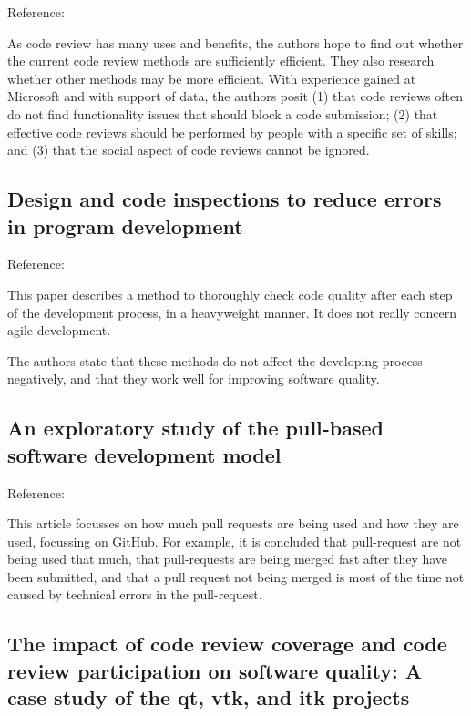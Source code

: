 \documentclass[]{book}
\begin{document}
Reference: \citet{czerwonka2015code}

As code review has many uses and benefits, the authors hope to find out
whether the current code review methods are sufficiently efficient. They
also research whether other methods may be more efficient. With
experience gained at Microsoft and with support of data, the authors
posit (1) that code reviews often do not find functionality issues that
should block a code submission; (2) that effective code reviews should
be performed by people with a specific set of skills; and (3) that the
social aspect of code reviews cannot be ignored.

\subsection{Design and code inspections to reduce errors in program
development}\label{design-and-code-inspections-to-reduce-errors-in-program-development}

Reference: \citet{fagan2002design}

This paper describes a method to thoroughly check code quality after
each step of the development process, in a heavyweight manner. It does
not really concern agile development.

The authors state that these methods do not affect the developing
process negatively, and that they work well for improving software
quality.

\subsection{An exploratory study of the pull-based software development
model}\label{an-exploratory-study-of-the-pull-based-software-development-model}

Reference: \citet{gousios2014exploratory}

This article focusses on how much pull requests are being used and how
they are used, focussing on GitHub. For example, it is concluded that
pull-request are not being used that much, that pull-requests are being
merged fast after they have been submitted, and that a pull request not
being merged is most of the time not caused by technical errors in the
pull-request.

\subsection{The impact of code review coverage and code review
participation on software quality: A case study of the qt, vtk, and itk
projects}\label{the-impact-of-code-review-coverage-and-code-review-participation-on-software-quality-a-case-study-of-the-qt-vtk-and-itk-projects}
\end{document}
